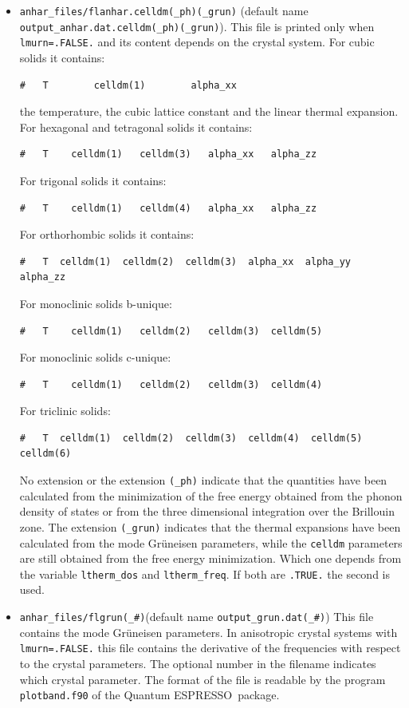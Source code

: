 \documentclass[12pt,a4paper]{article}
\def\qe{{\sc Quantum ESPRESSO}}
\begin{document}
\begin{itemize}
\item 
\texttt{anhar\_files/flanhar.celldm(\_ph)(\_grun)} 
(default name \\ \texttt{output\_anhar.dat.celldm(\_ph)(\_grun)}). 
This file is printed
only when \texttt{lmurn=.FALSE.} and its content depends on the crystal 
system. For cubic solids it contains: 
\begin{verbatim}
#   T        celldm(1)        alpha_xx
\end{verbatim}
the temperature, the cubic lattice constant and the linear thermal expansion.
For hexagonal and tetragonal solids it contains:
\begin{verbatim}
#   T    celldm(1)   celldm(3)   alpha_xx   alpha_zz
\end{verbatim}
For trigonal solids it contains:
\begin{verbatim}
#   T    celldm(1)   celldm(4)   alpha_xx   alpha_zz
\end{verbatim}
For orthorhombic solids it contains:
\begin{verbatim}
#   T  celldm(1)  celldm(2)  celldm(3)  alpha_xx  alpha_yy  alpha_zz
\end{verbatim}
For monoclinic solids b-unique:
\begin{verbatim}
#   T    celldm(1)   celldm(2)   celldm(3)  celldm(5)
\end{verbatim}
For monoclinic solids c-unique:
\begin{verbatim}
#   T    celldm(1)   celldm(2)   celldm(3)  celldm(4)
\end{verbatim}
For triclinic solids:
\begin{verbatim}
#   T  celldm(1)  celldm(2)  celldm(3)  celldm(4)  celldm(5)  celldm(6)
\end{verbatim}
No extension or the extension \texttt{(\_ph)} 
indicate that the quantities have been calculated from the minimization of
the free energy obtained from the phonon density of states or from the
three dimensional integration over the Brillouin zone. The extension
\texttt{(\_grun)} indicates that the thermal expansions have been
calculated from the mode Gr\"uneisen parameters, while the \texttt{celldm}
parameters are still obtained from the free energy minimization. Which
one depends from the variable \texttt{ltherm\_dos} and \texttt{ltherm\_freq}.
If both are \texttt{.TRUE.} the second is used.

\item 
\texttt{anhar\_files/flgrun(\_\#)}(default name 
\texttt{output\_grun.dat(\_\#)}) This file contains the mode Gr\"uneisen
parameters. In anisotropic crystal systems with \texttt{lmurn=.FALSE.} this
file contains the derivative of the frequencies with respect to the
crystal parameters. The optional number in the filename indicates which
crystal parameter. The format of the file is readable by the program
\texttt{plotband.f90} of the \qe\ package.


\end{itemize}
\end{document}
